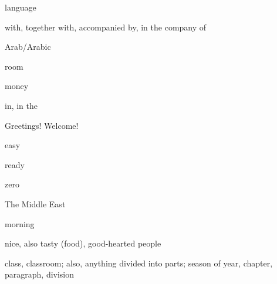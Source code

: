\begin{flashcard}{\LARGE language}
\LARGE {}
\end{flashcard}
\begin{flashcard}{\LARGE with, together with, accompanied by, in the company of}
\LARGE {}
\end{flashcard}
\begin{flashcard}{\LARGE Arab/Arabic}
\LARGE {}
\end{flashcard}
\begin{flashcard}{\LARGE room}
\LARGE {}
\end{flashcard}
\begin{flashcard}{\LARGE money}
\LARGE {}
\end{flashcard}
\begin{flashcard}{\LARGE in, in the}
\LARGE {}
\end{flashcard}
\begin{flashcard}{\LARGE Greetings! Welcome!}
\LARGE {}
\end{flashcard}
\begin{flashcard}{\LARGE easy}
\LARGE {}
\end{flashcard}
\begin{flashcard}{\LARGE ready}
\LARGE {}
\end{flashcard}
\begin{flashcard}{\LARGE zero}
\LARGE {}
\end{flashcard}
\begin{flashcard}{\LARGE The Middle East}
\LARGE {}
\end{flashcard}
\begin{flashcard}{\LARGE morning}
\LARGE {}
\end{flashcard}
\begin{flashcard}{\LARGE nice, also tasty (food), good-hearted people}
\LARGE {}
\end{flashcard}
\begin{flashcard}{\LARGE class, classroom; also, anything divided into parts; season of year, chapter, paragraph, division}
\LARGE {}
\end{flashcard}
